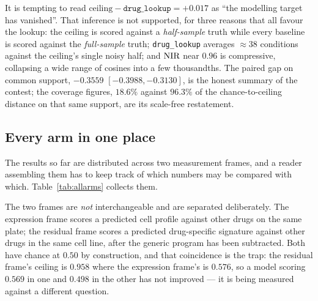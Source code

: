 It is tempting to read $\textrm{ceiling} - \texttt{drug\_lookup} = +0.017$ as ``the modelling
target has vanished''. That inference is not supported, for three reasons that all favour the
lookup: the ceiling is scored against a \emph{half-sample} truth while every baseline is scored
against the \emph{full-sample} truth; \texttt{drug\_lookup} averages $\approx 38$ conditions against
the ceiling's single noisy half; and $\textrm{NIR}$ near $0.96$ is compressive, collapsing a wide range of
cosines into a few thousandths. The paired gap on common support, $-0.3559$
\nolinebreak[3]$[-0.3988, -0.3130]$, is the honest summary of the contest; the coverage figures,
$18.6\%$ against $96.3\%$ of the chance-to-ceiling distance on that same support, are its
scale-free restatement.

\subsection{Every arm in one place}
\label{sec:res-summary}

The results so far are distributed across two measurement frames, and a reader assembling them has
to keep track of which numbers may be compared with which. Table~\ref{tab:allarms} collects them.

The two frames are \emph{not} interchangeable and are separated deliberately. The expression frame
scores a predicted cell profile against other drugs on the same plate; the residual frame scores a
predicted drug-specific signature against other drugs in the same cell line, after the generic
program has been subtracted. Both have chance at $0.50$ by construction, and that coincidence is the
trap: the residual frame's ceiling is $0.958$ where the expression frame's is $0.576$, so a model
scoring $0.569$ in one and $0.498$ in the other has not improved --- it is being measured against a
different question.

